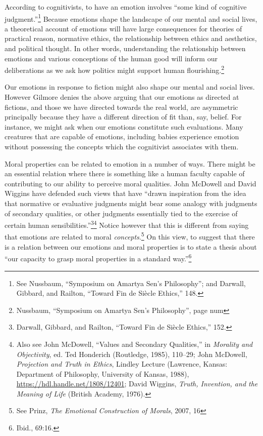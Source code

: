 \documentclass[phdthesis,12pt,final]{wuthesis}
\theoremstyle{definition}
\theoremstyle{definition}
\theoremstyle{definition}
\theoremstyle{definition}
\theoremstyle{remark}
\begin{document}
According to cognitivists, to have an emotion involves ``some kind of cognitive judgment.''\footnote{See Nussbaum, {``Symposium on {Amartya Sen}'s Philosophy''}; and Darwall, Gibbard, and Railton, {``Toward Fin de Siècle Ethics,''} 148.} Because emotions shape the landscape of our mental and social lives, a theoretical account of emotions will have large consequences for theories of practical reason, normative ethics, the relationship between ethics and aesthetics, and political thought. In other words, understanding the relationship between emotions and various conceptions of the human good will inform our deliberations as we ask how politics might support human flourishing.\footnote{Nussbaum, {``Symposium on {Amartya Sen}'s Philosophy''}, page num}

Our emotions in response to fiction might also shape our mental and social lives. However Gilmore denies the above arguing that our emotions as directed at fictions, and those we have directed towards the real world, are asymmetric principally because they have a different direction of fit than, say, belief. For instance, we might ask when our emotions constitute such evaluations. Many creatures that are capable of emotions, including babies experience emotion without possessing the concepts which the cognitivist associates with them.

Moral properties can be related to emotion in a number of ways. There might be an essential relation where there is something like a human faculty capable of contributing to our ability to perceive moral qualities. John McDowell and David Wiggins have defended such views that have ``drawn inspiration from the idea that normative or evaluative judgments might bear some analogy with judgments of secondary qualities, or other judgments essentially tied to the exercise of certain human sensibilities.''\footnote{Darwall, Gibbard, and Railton, {``Toward Fin de Siècle Ethics,''} 152.}\footnote{Also see John McDowell, {``Values and {Secondary Qualities},''} in \emph{Morality and {Objectivity}}, ed. Ted Honderich (Routledge, 1985), 110--29; John McDowell, \emph{Projection and {Truth} in {Ethics}}, Lindley Lecture (Lawrence, Kansas: Department of Philosophy, University of Kansas, 1988), \url{https://hdl.handle.net/1808/12401}; David Wiggins, \emph{Truth, {Invention}, and the {Meaning} of {Life}} (British Academy, 1976).} Notice however that this is different from saying that emotions are related to moral \emph{concepts}.\footnote{See Prinz, \emph{The {Emotional Construction} of {Morals}}, 2007, 16} On this view, to suggest that there is a relation between our emotions and moral properties is to state a thesis about ``our capacity to grasp moral properties in a standard way.''\footnote{Ibid., 69:16.}
\end{document}
